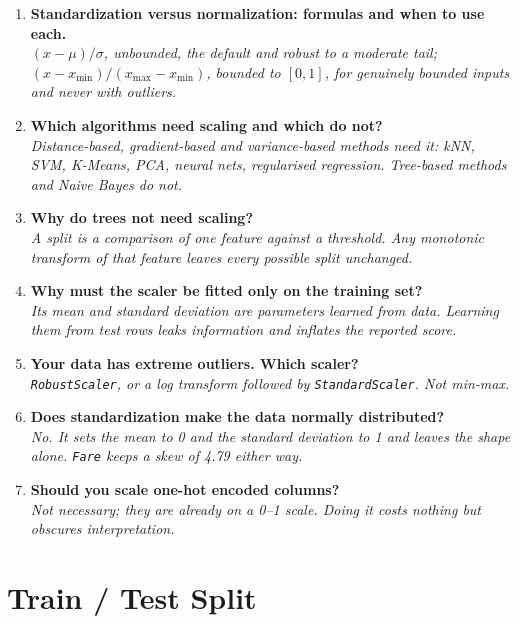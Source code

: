 \documentclass[11pt,a4paper]{article}
\begin{document}
\begin{enumerate}\itemsep4pt
  \item \textbf{Standardization versus normalization: formulas and when to use each.}\\
        \emph{$(x-\mu)/\sigma$, unbounded, the default and robust to a moderate tail;
        $(x-x_{\min})/(x_{\max}-x_{\min})$, bounded to $[0,1]$, for genuinely bounded inputs
        and never with outliers.}
  \item \textbf{Which algorithms need scaling and which do not?}\\
        \emph{Distance-based, gradient-based and variance-based methods need it: kNN, SVM,
        K-Means, PCA, neural nets, regularised regression. Tree-based methods and Naive
        Bayes do not.}
  \item \textbf{Why do trees not need scaling?}\\
        \emph{A split is a comparison of one feature against a threshold. Any monotonic
        transform of that feature leaves every possible split unchanged.}
  \item \textbf{Why must the scaler be fitted only on the training set?}\\
        \emph{Its mean and standard deviation are parameters learned from data. Learning
        them from test rows leaks information and inflates the reported score.}
  \item \textbf{Your data has extreme outliers. Which scaler?}\\
        \emph{\lstinline|RobustScaler|, or a log transform followed by
        \lstinline|StandardScaler|. Not min-max.}
  \item \textbf{Does standardization make the data normally distributed?}\\
        \emph{No. It sets the mean to 0 and the standard deviation to 1 and leaves the shape
        alone. \texttt{Fare} keeps a skew of 4.79 either way.}
  \item \textbf{Should you scale one-hot encoded columns?}\\
        \emph{Not necessary; they are already on a 0--1 scale. Doing it costs nothing but
        obscures interpretation.}
\end{enumerate}


\newpage
\section{Train / Test Split}

\end{document}
